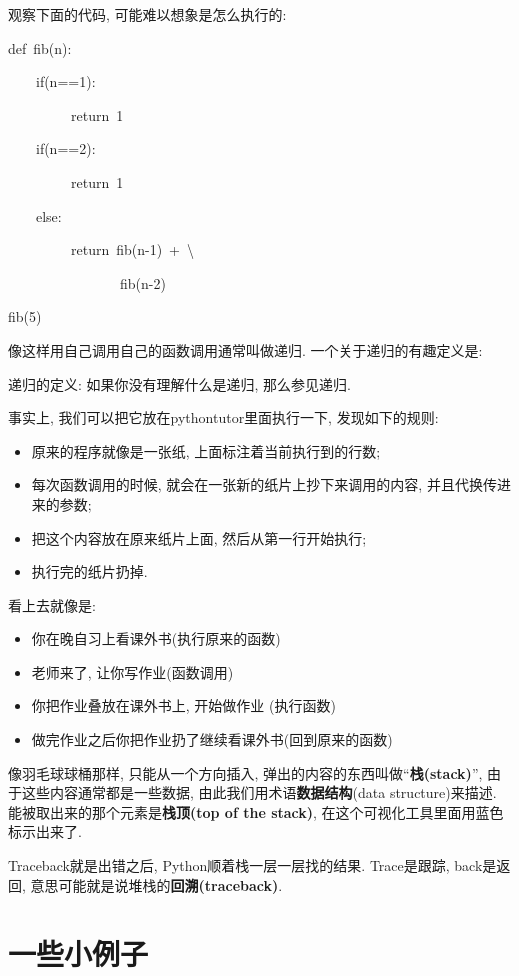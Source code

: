 观察下面的代码, 可能难以想象是怎么执行的:
\begin{lyxcode}
def~fib(n):

~~~~if(n==1):

~~~~~~~~~return~1

~~~~if(n==2):

~~~~~~~~~return~1

~~~~else:

~~~~~~~~~return~fib(n-1)~+~\textbackslash{}

~~~~~~~~~~~~~~~~fib(n-2)

fib(5)
\end{lyxcode}
像这样用自己调用自己的函数调用通常叫做递归. 一个关于递归的有趣定义是:
\begin{definition}
递归的定义: 如果你没有理解什么是递归, 那么参见递归. 
\end{definition}
事实上, 我们可以把它放在pythontutor里面执行一下, 发现如下的规则:
\begin{itemize}
\item 原来的程序就像是一张纸, 上面标注着当前执行到的行数;
\item 每次函数调用的时候, 就会在一张新的纸片上抄下来调用的内容, 并且代换传进来的参数;
\item 把这个内容放在原来纸片上面, 然后从第一行开始执行;
\item 执行完的纸片扔掉.
\end{itemize}
看上去就像是:
\begin{itemize}
\item 你在晚自习上看课外书(执行原来的函数) 
\item 老师来了, 让你写作业(函数调用) 
\item 你把作业叠放在课外书上, 开始做作业 (执行函数)
\item 做完作业之后你把作业扔了继续看课外书(回到原来的函数)
\end{itemize}
像羽毛球球桶那样, 只能从一个方向插入, 弹出的内容的东西叫做``\textbf{栈(stack)}'', 由于这些内容通常都是一些数据,
由此我们用术语\textbf{数据结构}(data structure)来描述. 能被取出来的那个元素是\textbf{栈顶(top
of the stack)}, 在这个可视化工具里面用蓝色标示出来了. 

Traceback就是出错之后, Python顺着栈一层一层找的结果. Trace是跟踪, back是返回, 意思可能就是说堆栈的\textbf{回溯(traceback)}.





\section{一些小例子}

